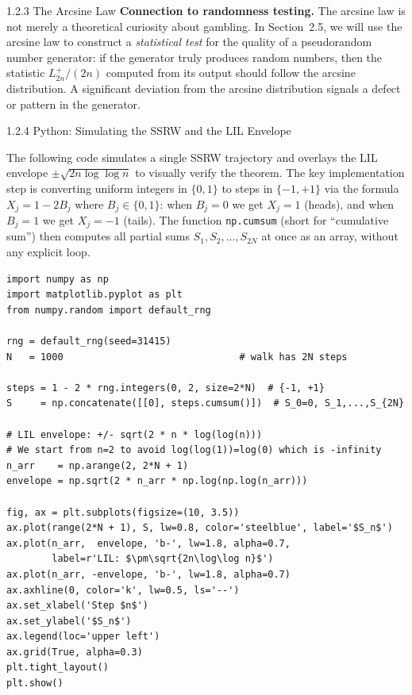 \documentclass[aspectratio=169,10pt]{beamer}
\begin{document}
\begin{frame}[allowframebreaks]{1.2.3 The Arcsine Law}
  \textbf{Connection to randomness testing.}  The arcsine law is not merely a
  theoretical curiosity about gambling.  In Section~2.5, we will use the
  arcsine law to construct a \emph{statistical test} for the quality of a
  pseudorandom number generator: if the generator truly produces random numbers,
  then the statistic $L^+_{2n}/(2n)$ computed from its output should follow the
  arcsine distribution.  A significant deviation from the arcsine distribution
  signals a defect or pattern in the generator.

\end{frame}

\begin{frame}[fragile]{1.2.4 Python: Simulating the SSRW and the LIL Envelope}

  The following code simulates a single SSRW trajectory and overlays the LIL
  envelope $\pm\sqrt{2n \log \log n}$ to visually verify the theorem.  The key
  implementation step is converting uniform integers in $\{0, 1\}$ to steps in
  $\{-1, +1\}$ via the formula $X_j = 1 - 2B_j$ where $B_j \in \{0, 1\}$:
  when $B_j = 0$ we get $X_j = 1$ (heads), and when $B_j = 1$ we get
  $X_j = -1$ (tails).  The function \texttt{np.cumsum} (short for
  ``cumulative sum'') then computes all partial sums $S_1, S_2, \ldots,
  S_{2N}$ at once as an array, without any explicit loop.

\begin{lstlisting}[style=python]
import numpy as np
import matplotlib.pyplot as plt
from numpy.random import default_rng

rng = default_rng(seed=31415)
N   = 1000                               # walk has 2N steps

steps = 1 - 2 * rng.integers(0, 2, size=2*N)  # {-1, +1}
S     = np.concatenate([[0], steps.cumsum()])  # S_0=0, S_1,...,S_{2N}

# LIL envelope: +/- sqrt(2 * n * log(log(n)))
# We start from n=2 to avoid log(log(1))=log(0) which is -infinity
n_arr    = np.arange(2, 2*N + 1)
envelope = np.sqrt(2 * n_arr * np.log(np.log(n_arr)))

fig, ax = plt.subplots(figsize=(10, 3.5))
ax.plot(range(2*N + 1), S, lw=0.8, color='steelblue', label='$S_n$')
ax.plot(n_arr,  envelope, 'b-', lw=1.8, alpha=0.7,
        label=r'LIL: $\pm\sqrt{2n\log\log n}$')
ax.plot(n_arr, -envelope, 'b-', lw=1.8, alpha=0.7)
ax.axhline(0, color='k', lw=0.5, ls='--')
ax.set_xlabel('Step $n$')
ax.set_ylabel('$S_n$')
ax.legend(loc='upper left')
ax.grid(True, alpha=0.3)
plt.tight_layout()
plt.show()
\end{lstlisting}

\end{frame}
\end{document}
